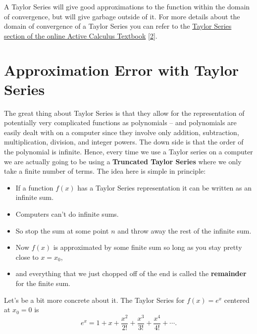 \documentclass[
]{book}
\providecommand{\tightlist}{%
  \setlength{\itemsep}{0pt}\setlength{\parskip}{0pt}}
\theoremstyle{definition}
\theoremstyle{definition}
\theoremstyle{definition}
\theoremstyle{remark}
\begin{document}
A Taylor Series will give good approximations to the function within the domain of convergence, but will give garbage outside of it. For more details about the domain of convergence of a Taylor Series you can refer to the \href{https://activecalculus.org/single/sec-8-5-taylor.html}{Taylor Series section of the online Active Calculus Textbook} {[}\protect\hyperlink{ref-active-calculus}{2}{]}.

\hypertarget{approximation-error-with-taylor-series}{%
\section{Approximation Error with Taylor Series}\label{approximation-error-with-taylor-series}}

The great thing about Taylor Series is that they allow for the
representation of potentially very complicated functions as polynomials -- and polynomials are
easily dealt with on a computer since they involve only addition,
subtraction, multiplication, division, and integer powers. The down side is that
the order of the polynomial is infinite. Hence, every time we use a Taylor series on a
computer we are actually going to be using a \textbf{Truncated Taylor Series}
where we only take a finite number of terms. The idea here is simple in principle:

\begin{itemize}
\tightlist
\item
  If a function \(f(x)\) has a Taylor Series representation it can be written as an infinite sum.
\item
  Computers can't do infinite sums.
\item
  So stop the sum at some point \(n\) and throw away the rest of the infinite sum.
\item
  Now \(f(x)\) is approximated by some finite sum so long as you stay pretty close to \(x = x_0\),
\item
  and everything that we just chopped off of the end is called the \textbf{remainder} for the finite sum.
\end{itemize}

Let's be a bit more concrete about it. The Taylor Series for \(f(x) = e^x\) centered at \(x_0 = 0\) is
\[ e^x = 1 + x + \frac{x^2}{2!} + \frac{x^3}{3!} + \frac{x^4}{4!} + \cdots. \]
\end{document}
